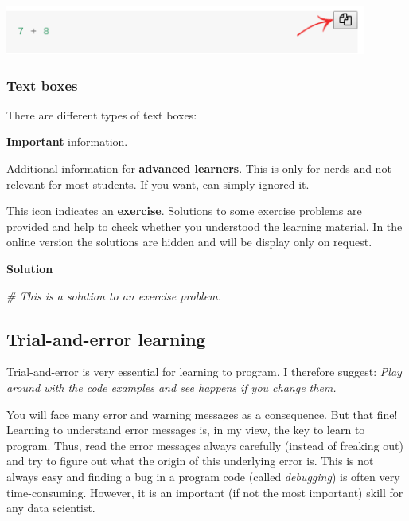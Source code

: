 \documentclass[
]{scrartcl}
\makeatletter
\newenvironment{Shaded}{\begin{snugshade}}{\end{snugshade}}
\newcommand{\CommentTok}[1]{\textcolor[rgb]{0.56,0.35,0.01}{\textit{#1}}}
\newenvironment{kframe}{%
\medskip{}
\setlength{\fboxsep}{.8em}
 \def\at@end@of@kframe{}%
 \ifinner\ifhmode%
  \def\at@end@of@kframe{\end{minipage}}%
  \begin{minipage}{\columnwidth}%
 \fi\fi%
 \def\FrameCommand##1{\hskip\@totalleftmargin \hskip-\fboxsep
 \colorbox{shadecolor}{##1}\hskip-\fboxsep
     \hskip-\linewidth \hskip-\@totalleftmargin \hskip\columnwidth}%
 \MakeFramed {\advance\hsize-\width
   \@totalleftmargin\z@ \linewidth\hsize
   \@setminipage}}%
 {\par\unskip\endMakeFramed%
 \at@end@of@kframe}
\newenvironment{rmdblock}[1]
  {
  \begin{itemize}
  \renewcommand{\labelitemi}{
    \raisebox{-.7\height}[0pt][0pt]{
      {\setkeys{Gin}{width=3em,keepaspectratio}\texttt{[image: images/\#1]}}
    }
  }
  \setlength{\fboxsep}{1em}
  \begin{kframe}
  \item
  }
  {
  \end{kframe}
  \end{itemize}
  }
\newenvironment{geek}
    {\begin{rmdblock}{geek}}
    {\end{rmdblock}}
\newenvironment{important}
    {\begin{rmdblock}{hint}}
    {\end{rmdblock}}
\newenvironment{myexercise}
    {\begin{rmdblock}{exercise_green}}
    {\end{rmdblock}}
\newenvironment{webexsolution}[1]
    {\par\tiny\textbf{#1}}
    {\par}
\newcommand{\webexhide}[1]{\begin{webexsolution}{#1}}
\newcommand{\webexunhide}{\end{webexsolution}}
\makeatother
\begin{document}
\begin{center}\includegraphics[width=450px]{images/click_copy_code} \end{center}

\subsubsection{Text boxes}\label{text-boxes}

There are different types of text boxes:

\begin{important}
\textbf{Important} information.
\end{important}

\begin{geek}
Additional information for \textbf{advanced learners}. This is only for
nerds and not relevant for most students. If you want, can simply
ignored it.
\end{geek}

\begin{myexercise}
This icon indicates an \textbf{exercise}. Solutions to some exercise
problems are provided and help to check whether you understood the
learning material. In the online version the solutions are hidden and
will be display only on request.
\end{myexercise}
\webexhide{Solution}

\begin{Shaded}
\begin{Highlighting}[]
\CommentTok{\# This is a solution to an exercise problem.}
\end{Highlighting}
\end{Shaded}

\webexunhide

\subsection{Trial-and-error learning}\label{trial-and-error-learning}

Trial-and-error is very essential for learning to program. I therefore suggest: \emph{Play around with the code examples and see happens if you change them.}

You will face many error and warning messages as a consequence. But that fine! Learning to understand error messages is, in my view, the key to learn to program. Thus, read the error messages always carefully (instead of freaking out) and try to figure out what the origin of this underlying error is. This is not always easy and finding a bug in a program code (called \emph{debugging}) is often very time-consuming. However, it is an important (if not the most important) skill for any data scientist.
\end{document}
